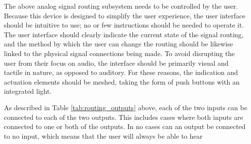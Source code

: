 \documentclass{article}
\begin{document}
	The above analog signal routing subsystem needs to be controlled by the user.  Because this device is designed to simplify the user experience, the user interface should be intuitive to use; no or few instructions should be needed to operate it.  The user interface should clearly indicate the current state of the signal routing, and the method by which the user can change the routing should be likewise linked to the physical signal connections being made.  To avoid disrupting the user from their focus on audio, the interface should be primarily visual and tactile in nature, as opposed to auditory.  For these reasons, the indication and actuation elements should be meshed, taking the form of push buttons with an integrated light.

	As described in Table \ref{tab:routing_outputs} above, each of the two inputs can be connected to each of the two outputs.  This includes cases where both inputs are connected to one or both of the outputs.  In no cases can an output be connected to no input, which means that the user will always be able to hear 
\end{document}
